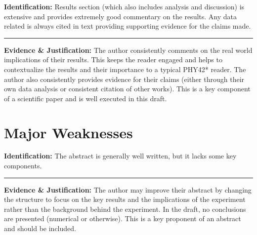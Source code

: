 \documentclass[%
 aip,
cp,  %
 amsmath,amssymb,
 reprint,%
nofootinbib
]{revtex4-2}
\begin{document}
\begin{mdframed}
    \textbf{Identification:}
    Results section (which also includes analysis and discussion) is extensive and provides extremely good commentary on the results. Any data related is always cited in text providing supporting evidence for the claims made.
    \begin{center}
        \noindent\rule{0.9\textwidth}{0.5pt}
    \end{center}
    \textbf{Evidence \& Justification:}
    The author consistently comments on the real world implications of their results. This keeps the reader engaged and helps to contextualize the results and their importance to a typical PHY42* reader. The author also consistently provides evidence for their claims (either through their own data analysis or consistent citation of other works). This is a key component of a scientific paper and is well executed in this draft.
\end{mdframed}

\section{Major Weaknesses}
\begin{mdframed}
    \textbf{Identification:}
    The abstract is generally well written, but it  lacks some key components. 
    \begin{center}
        \noindent\rule{0.9\textwidth}{0.5pt}
    \end{center}
    \textbf{Evidence \& Justification:}
    The author may improve their abstract by changing the structure to focus on the key results and the implications of the experiment rather than the background behind the experiment. In the draft, no conclusions are presented (numerical or otherwise). This is a key proponent of an abstract and should be included.
\end{mdframed}
\end{document}
